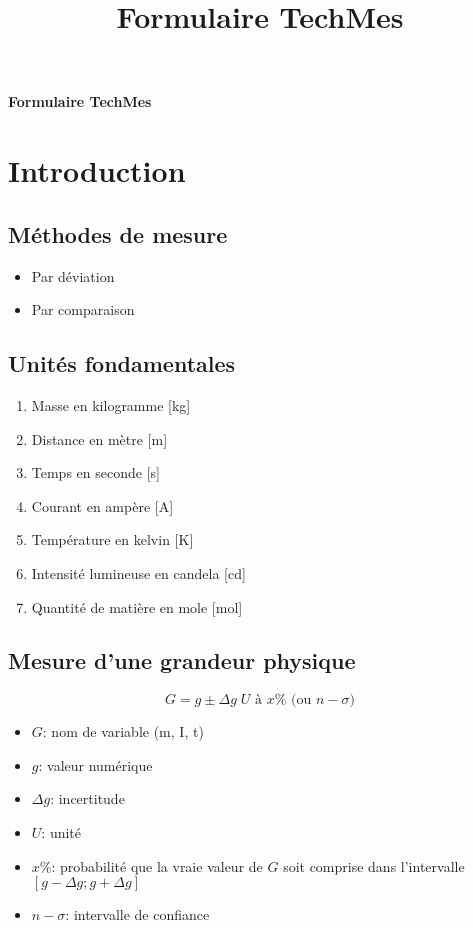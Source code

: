 \documentclass[10pt]{article} %
\title{Formulaire TechMes}
\begin{document}
\begin{multicols}{3}
\begin{flushleft}
	
	\begin{center}
		{\Large \bf Formulaire TechMes} \\
	\end{center}
	
	\section*{Introduction}
		
		\subsection*{Méthodes de mesure}
		
			\begin{itemize}
				\item Par déviation
				\item Par comparaison
			\end{itemize}
			
		\subsection*{Unités fondamentales}
			
			\begin{enumerate}
				\item Masse en kilogramme [kg]
				\item Distance en mètre [m]
				\item Temps en seconde [s]
				\item Courant en ampère [A]
				\item Température en kelvin [K]
				\item Intensité lumineuse en candela [cd]
				\item Quantité de matière en mole [mol]
			\end{enumerate}
			
		\subsection*{Mesure d'une grandeur physique}
			
			\[G = g \pm \Delta g \; U \text{ à } x\% \text{ (ou }n-\sigma)\]
			
			\begin{itemize}
				\item $G$: nom de variable (m, I, t)
				\item $g$: valeur numérique
				\item $\Delta g$: incertitude
				\item $U$: unité
				\item $x\%$: probabilité que la vraie valeur de $G$ soit comprise dans l'intervalle $[g-\Delta g;g+\Delta g]$
				\item $n-\sigma$: intervalle de confiance
			\end{itemize}
			

\end{flushleft}
\end{multicols}
\end{document}
